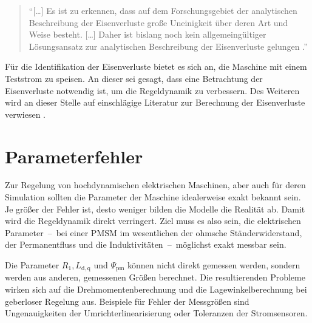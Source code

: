 \documentclass[conference,twocolumn]{IEEEtran}
\newcommand{\x}[1]{\mathrm{#1}}
\begin{document}
\begin{quote}
\enquote{[\ldots] Es ist zu erkennen, dass auf dem Forschungsgebiet der analytischen Beschreibung
der Eisenverluste große Uneinigkeit über deren Art und Weise besteht. [\ldots] Daher ist bislang
noch kein allgemeingültiger Lösungsansatz zur analytischen Beschreibung der
Eisenverluste gelungen \autocite[S.~65]{Kellner2012}.} 
\end{quote}

Für die Identifikation der Eisenverluste bietet es sich an, die Maschine mit einem Teststrom zu speisen.
An dieser sei gesagt, dass eine Betrachtung der Eisenverluste notwendig ist, um die Regeldynamik zu verbessern.
Des Weiteren wird an dieser Stelle auf einschlägige Literatur zur Berechnung der Eisenverluste verwiesen \autocites{Kellner2012}{reinert_calculation_2001}{stumberger_evaluation_2003}.

\section{Parameterfehler}\label{sec:parameterfehler}

Zur Regelung von hochdynamischen elektrischen Maschinen, aber auch für deren Simulation sollten die Parameter der Maschine idealerweise exakt bekannt sein.
Je größer der Fehler ist, desto weniger bilden die Modelle die Realität ab.
Damit wird die Regeldynamik direkt verringert.
Ziel muss es also sein, die elektrischen Parameter~--~bei einer PMSM im wesentlichen der ohmsche Ständerwiderstand, der Permanentfluss und die Induktivitäten~--~möglichst exakt messbar sein.

Die Parameter $R_\x{1}, L_\x{d,q}$ und $\Psi_\x{pm}$ können nicht direkt gemessen werden, sondern werden aus anderen, gemessenen Größen berechnet.
Die resultierenden Probleme wirken sich auf die Drehmomentenberechnung und die Lagewinkelberechnung bei geberloser Regelung aus.
Beispiele für Fehler der Messgrößen sind Ungenauigkeiten der Umrichterlinearisierung oder Toleranzen der Stromsensoren.

\end{document}
